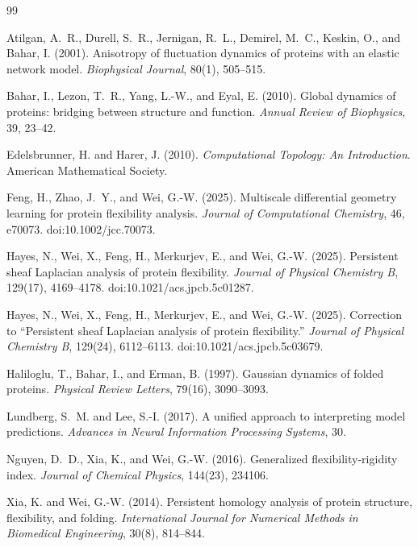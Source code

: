 \documentclass[11pt]{article}
\begin{document}
\begin{thebibliography}{99}

Atilgan, A.~R., Durell, S.~R., Jernigan, R.~L., Demirel, M.~C.,
Keskin, O., and Bahar, I. (2001).
Anisotropy of fluctuation dynamics of proteins with an elastic network model.
\textit{Biophysical Journal}, 80(1), 505--515.

Bahar, I., Lezon, T.~R., Yang, L.-W., and Eyal, E. (2010).
Global dynamics of proteins: bridging between structure and function.
\textit{Annual Review of Biophysics}, 39, 23--42.

Edelsbrunner, H. and Harer, J. (2010).
\textit{Computational Topology: An Introduction}.
American Mathematical Society.

Feng, H., Zhao, J.~Y., and Wei, G.-W. (2025).
Multiscale differential geometry learning for protein flexibility analysis.
\textit{Journal of Computational Chemistry}, 46, e70073.
doi:10.1002/jcc.70073.

Hayes, N., Wei, X., Feng, H., Merkurjev, E., and Wei, G.-W. (2025).
Persistent sheaf Laplacian analysis of protein flexibility.
\textit{Journal of Physical Chemistry B}, 129(17), 4169--4178.
doi:10.1021/acs.jpcb.5c01287.

Hayes, N., Wei, X., Feng, H., Merkurjev, E., and Wei, G.-W. (2025).
Correction to ``Persistent sheaf Laplacian analysis of protein flexibility.''
\textit{Journal of Physical Chemistry B}, 129(24), 6112--6113.
doi:10.1021/acs.jpcb.5c03679.

Haliloglu, T., Bahar, I., and Erman, B. (1997).
Gaussian dynamics of folded proteins.
\textit{Physical Review Letters}, 79(16), 3090--3093.

Lundberg, S.~M. and Lee, S.-I. (2017).
A unified approach to interpreting model predictions.
\textit{Advances in Neural Information Processing Systems}, 30.

Nguyen, D.~D., Xia, K., and Wei, G.-W. (2016).
Generalized flexibility-rigidity index.
\textit{Journal of Chemical Physics}, 144(23), 234106.

Xia, K. and Wei, G.-W. (2014).
Persistent homology analysis of protein structure, flexibility, and folding.
\textit{International Journal for Numerical Methods in Biomedical Engineering},
30(8), 814--844.

\end{thebibliography}
\end{document}
